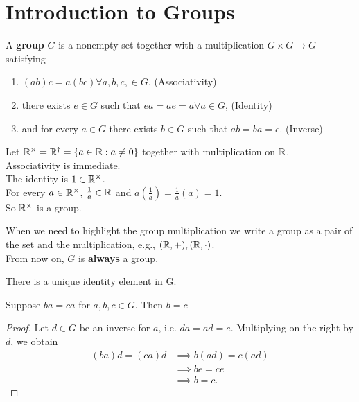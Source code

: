 \chapter{Introduction to Groups}

\begin{definition}[a group]
    A \textbf{group} $G$ is a nonempty set together with a multiplication $G \times G \to G$ satisfying
    \begin{enumerate}
        \item $(ab)c = a(bc) \forall a, b, c, \in G$, (Associativity)
        \item there exists $e \in G$ such that $ea = ae = a \forall a \in G$, (Identity)
        \item and for every $a \in G$ there exists $b \in G$ such that $ab = ba = e$. (Inverse)
    \end{enumerate}
\end{definition}

\begin{example}[a group]
    Let $\mathbb{R}^\times = \mathbb{R}^\dag = \left\{a \in \mathbb{R}: a \neq 0\right\}$ together with multiplication on $\mathbb{R}$. \\
    Associativity is immediate. \\
    The identity is $1 \in \mathbb{R}^\times$. \\
    For every $a \in \mathbb{R}^\times$, $\frac{1}{a} \in \mathbb{R}$ and $a(\frac{1}{a}) = \frac{1}{a}(a) = 1$. \\
    So $\mathbb{R}^\times$ is a group.
\end{example}

\begin{remark}
    When we need to highlight the group multiplication we write a group as a pair of the set and the multiplication, e.g., $(\mathbb{R}, +), (\mathbb{R}, \cdot)$. \\
    From now on, $G$ is \textbf{always} a group.
\end{remark}

\begin{theorem}
    There is a unique identity element in G.
\end{theorem}

\begin{theorem}[Cancellation] \label{thm:Cancellation}
    Suppose $ba = ca$ for $a,b,c \in G$. Then $b = c$ 
\end{theorem}
\begin{proof}
    Let $d \in G$ be an inverse for $a$, i.e. $da = ad = e$.
    Multiplying on the right by $d$, we obtain
    \begin{align*}
        (ba)d = (ca)d &\implies b(ad) = c(ad) \\
        &\implies be = ce \\
        &\implies b = c.
    \end{align*}
\end{proof}   

